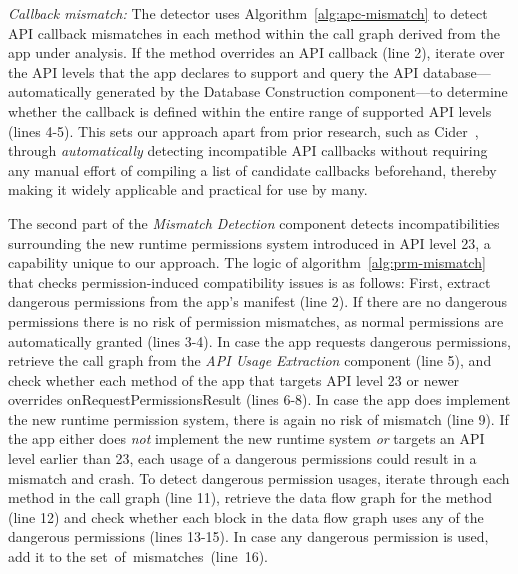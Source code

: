 \textit{Callback mismatch:} %
The detector uses Algorithm~\ref{alg:apc-mismatch} to detect API callback mismatches in each method within the call graph derived from the app under analysis.
If the method overrides an API callback
(line 2), iterate over the API levels that the app declares to support and query
the API database---automatically generated by the Database Construction
component---to determine whether the callback is defined within the entire range
of supported API levels (lines 4-5). This sets our approach apart from prior
research, such as {\sc Cider}~\cite{wu2017measuring}, through
\emph{automatically} detecting incompatible API callbacks without requiring any
manual effort of compiling a list of candidate callbacks beforehand, thereby
making it widely applicable and practical for use by many.








\begin{figure}[t!]%
        
\end{figure}


The second part of the \textit{Mismatch Detection} component detects
incompatibilities surrounding the new runtime permissions system introduced in
API level 23, a capability unique to our approach. %
The logic of algorithm~\ref{alg:prm-mismatch} that checks permission-induced compatibility issues is as follows:
First, extract dangerous permissions from the app's manifest (line 2).  If there are no
dangerous permissions there is no risk of permission mismatches,
as normal permissions are automatically granted (lines 3-4).  In case the app
requests dangerous permissions, retrieve the call graph from the \textit{API Usage
Extraction} component (line 5), and check whether each method of the app that
targets API level 23 or newer overrides {\sf onRequestPermissionsResult} (lines
6-8). In case the app does implement the new runtime permission system, there
is again no risk of mismatch (line 9).  If the app either does \emph{not} implement
the new runtime system \emph{or} targets an API level earlier than
23, each usage of a dangerous permissions could result in a mismatch and crash.
To detect dangerous permission usages, iterate through each method in the call
graph (line 11), retrieve the data flow graph for the method (line 12) and check
whether each block in the data flow graph uses any of the dangerous permissions
(lines 13-15). In case any dangerous permission is used, add it to the
set~of~mismatches~(line~16).


